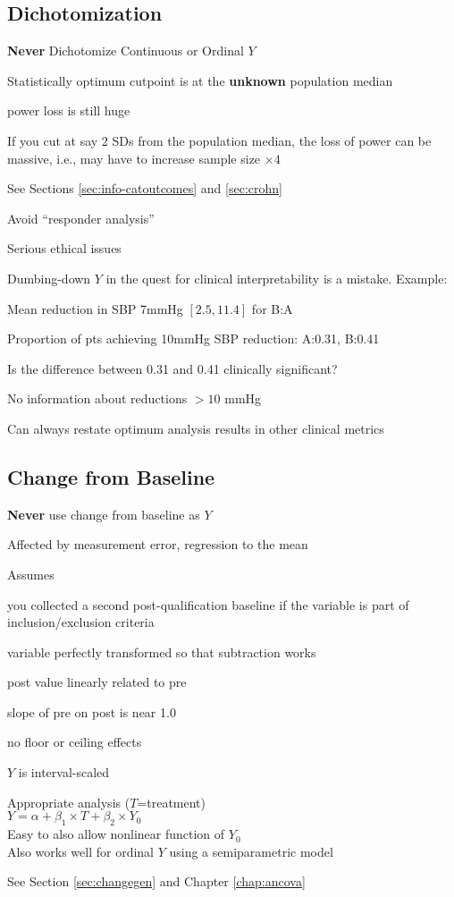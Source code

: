 \subsection{Dichotomization}\label{sec:overview-dichotomization}
\textbf{Never} Dichotomize Continuous or Ordinal $Y$
  \bi
  \item Statistically optimum cutpoint is at the \textbf{unknown}
    population median  
    \bi
    \item power loss is still huge
    \ei
  \item If you cut at say 2 SDs from the population median, the loss
    of power can be massive, i.e., may have to increase sample size
    $\times 4$
  \item See Sections \ref{sec:info-catoutcomes} and \ref{sec:crohn}
  \item Avoid ``responder analysis''
  \item Serious ethical issues
  \item Dumbing-down $Y$ in the quest for clinical interpretability is
    a mistake.  Example:
    \bi
    \item Mean reduction in SBP 7mmHg $[2.5, 11.4]$ for B:A
    \item Proportion of pts achieving 10mmHg SBP reduction: A:0.31, B:0.41
      \bi
      \item Is the difference between 0.31 and 0.41 clinically significant?
      \item No information about reductions $> 10$ mmHg
      \ei
    \ei
  \item Can always restate optimum analysis results in other clinical metrics
  \ei
  
\subsection{Change from Baseline}\label{sec:overview-change}
\textbf{Never} use change from baseline as $Y$
  \bi
  \item Affected by measurement error, regression to the mean
  \item Assumes
    \bi
    \item you collected a second post-qualification baseline if the
      variable is part of inclusion/exclusion criteria
    \item variable perfectly transformed so that subtraction works
    \item post value linearly related to pre
    \item slope of pre on post is near 1.0
    \item no floor or ceiling effects
    \item $Y$ is interval-scaled
    \ei
  \item Appropriate analysis ($T$=treatment) \\
  $Y = \alpha + \beta_{1}\times T + \beta_{2} \times Y_{0}$ \\
  Easy to also allow nonlinear function of $Y_{0}$\\
  Also works well for ordinal $Y$ using a semiparametric model
  \item See Section \ref{sec:changegen} and Chapter \ref{chap:ancova}
  \ei

